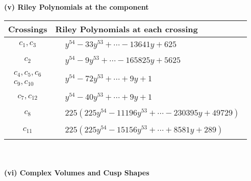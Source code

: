 \documentclass[1p]{elsarticle_modified}
\theoremstyle{definition}
\begin{document}
\newpage\renewcommand{\arraystretch}{1}
\flushleft \textbf{(v) Riley Polynomials at the component}\newline \\
\begin{tabular}{m{50pt}|m{274pt}}
Crossings & \hspace{64pt}Riley Polynomials at each crossing \\
\hline $$\begin{aligned}c_{1},c_{3}\end{aligned}$$&$\begin{aligned}
&y^{54}-33 y^{53}+\cdots-13641 y+625
\end{aligned}$\\
\hline $$\begin{aligned}c_{2}\end{aligned}$$&$\begin{aligned}
&y^{54}-9 y^{53}+\cdots-165825 y+5625
\end{aligned}$\\
\hline $$\begin{aligned}c_{4},c_{5},c_{6}\\c_{9},c_{10}\end{aligned}$$&$\begin{aligned}
&y^{54}-72 y^{53}+\cdots+9 y+1
\end{aligned}$\\
\hline $$\begin{aligned}c_{7},c_{12}\end{aligned}$$&$\begin{aligned}
&y^{54}-40 y^{53}+\cdots+9 y+1
\end{aligned}$\\
\hline $$\begin{aligned}c_{8}\end{aligned}$$&$\begin{aligned}
&225(225 y^{54}-11196 y^{53}+\cdots-230395 y+49729)
\end{aligned}$\\
\hline $$\begin{aligned}c_{11}\end{aligned}$$&$\begin{aligned}
&225(225 y^{54}-15156 y^{53}+\cdots+8581 y+289)
\end{aligned}$\\
\hline
\end{tabular}\\~\\
\newpage\flushleft \textbf{(vi) Complex Volumes and Cusp Shapes}
\end{document}
